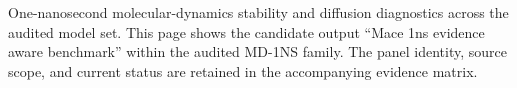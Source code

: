 One-nanosecond molecular-dynamics stability and diffusion diagnostics across the audited model set. This page shows the candidate output ``Mace 1ns evidence aware benchmark'' within the audited MD-1NS family. The panel identity, source scope, and current status are retained in the accompanying evidence matrix.
